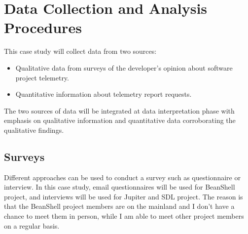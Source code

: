 





\section{Data Collection and Analysis Procedures} \label{EvaluationInIkayzo:DataAnalysis}

This case study will collect data from two sources:
\begin{itemize}
	\item Qualitative data from surveys of the developer's opinion about software project telemetry. 
	\item Quantitative information about telemetry report requests.
\end{itemize}

The two sources of data will be integrated at data interpretation phase with emphasis on qualitative information and quantitative data corroborating the qualitative findings.





\subsection{Surveys}

Different approaches can be used to conduct a survey such as questionnaire or interview. In this case study, email questionnaires will be used for BeanShell project, and interviews will be used for Jupiter and SDL project. The reason is that the BeanShell project members are on the mainland and I don't have a chance to meet them in person, while I am able to meet other project members on a regular basis.

